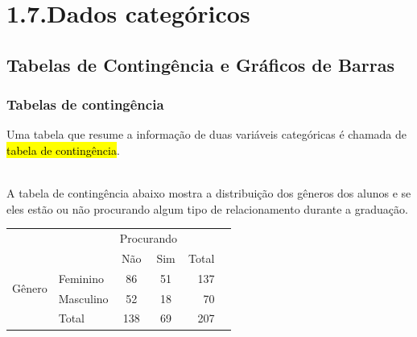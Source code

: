 
\section{1.7.Dados categóricos}


\subsection{Tabelas de Contingência e Gráficos de Barras}


\begin{frame}
\frametitle{Tabelas de contingência}

\justifying
Uma tabela que resume a informação de duas variáveis categóricas é chamada de \hl {tabela de contingência}.

$\:$ \\
\pause
\justifying
A tabela de contingência abaixo mostra a distribuição dos gêneros dos alunos e se eles estão ou não procurando algum tipo de relacionamento durante a graduação.

\begin{center}
\begin{tabular}{l l cc rr}
					& 			& \multicolumn{2}{c}{{Procurando}} \\
  \cline{3-4}
					&			& Não	& Sim	& Total & \hspace{3mm}  \\ 
  \cline{2-5}
\multirow{2}{*}{{Gênero}}& Feminino 		& 86 	& 51 		& 137 \\ 
  					& Masculino 		& 52 	& 18	 	& 70\\ 
  \cline{2-5}
  					& Total		& 138& 69	&  207 \\
  \cline{2-5}
\end{tabular}
\end{center}

\end{frame}


